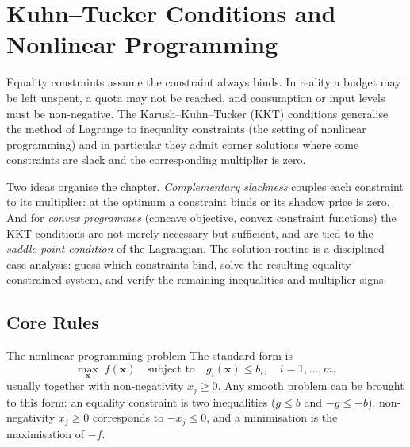 \chapter{Kuhn--Tucker Conditions and Nonlinear Programming}

Equality constraints assume the constraint always binds. In reality a budget
may be left unspent, a quota may not be reached, and consumption or input
levels must be non-negative. The Karush--Kuhn--Tucker (KKT) conditions generalise the method of Lagrange to
inequality constraints (the setting of nonlinear programming) and in particular they admit corner solutions
where some constraints are slack and the corresponding multiplier is zero.

Two ideas organise the chapter. \emph{Complementary slackness} couples each constraint to its multiplier:
at the optimum a constraint binds or its shadow price is zero. And for
\emph{convex programmes} (concave objective,
convex constraint functions) the KKT conditions are not merely necessary
but sufficient, and are tied to the \emph{saddle-point condition} of the Lagrangian. The solution routine is a
disciplined case analysis: guess which constraints bind, solve the
resulting equality-constrained system, and verify the remaining
inequalities and multiplier signs.

\section{Core Rules}

\begin{rulebox}{The nonlinear programming problem}
The standard form is
\[
  \max_{\mathbf{x}} \; f(\mathbf{x}) \quad \text{subject to} \quad
  g_i(\mathbf{x}) \leq b_i, \quad i = 1, \dots, m,
\]
usually together with non-negativity $x_j \geq 0$. Any smooth problem can
be brought to this form: an equality constraint is two inequalities
($g \leq b$ and $-g \leq -b$), non-negativity $x_j \geq 0$ corresponds to
$-x_j \leq 0$, and a minimisation is the maximisation of $-f$.
\end{rulebox}

